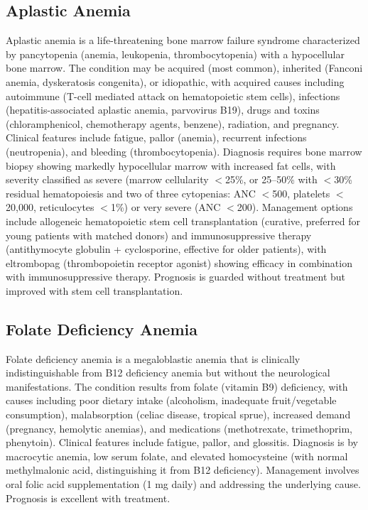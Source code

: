\subsection{Aplastic Anemia}
\label{sec:Aplastic Anemia}
Aplastic anemia is a life-threatening bone marrow failure syndrome characterized by pancytopenia (anemia, leukopenia, thrombocytopenia) with a hypocellular bone marrow. The condition may be acquired (most common), inherited (Fanconi anemia, dyskeratosis congenita), or idiopathic, with acquired causes including autoimmune (T-cell mediated attack on hematopoietic stem cells), infections (hepatitis-associated aplastic anemia, parvovirus B19), drugs and toxins (chloramphenicol, chemotherapy agents, benzene), radiation, and pregnancy. Clinical features include fatigue, pallor (anemia), recurrent infections (neutropenia), and bleeding (thrombocytopenia). Diagnosis requires bone marrow biopsy showing markedly hypocellular marrow with increased fat cells, with severity classified as severe (marrow cellularity $<$25\%, or 25--50\% with $<$30\% residual hematopoiesis and two of three cytopenias: ANC $<$500, platelets $<$20,000, reticulocytes $<$1\%) or very severe (ANC $<$200). Management options include allogeneic hematopoietic stem cell transplantation (curative, preferred for young patients with matched donors) and immunosuppressive therapy (antithymocyte globulin + cyclosporine, effective for older patients), with eltrombopag (thrombopoietin receptor agonist) showing efficacy in combination with immunosuppressive therapy. Prognosis is guarded without treatment but improved with stem cell transplantation.

\subsection{Folate Deficiency Anemia}
\label{sec:Folate Deficiency Anemia}
Folate deficiency anemia is a megaloblastic anemia that is clinically indistinguishable from B12 deficiency anemia but without the neurological manifestations. The condition results from folate (vitamin B9) deficiency, with causes including poor dietary intake (alcoholism, inadequate fruit/vegetable consumption), malabsorption (celiac disease, tropical sprue), increased demand (pregnancy, hemolytic anemias), and medications (methotrexate, trimethoprim, phenytoin). Clinical features include fatigue, pallor, and glossitis. Diagnosis is by macrocytic anemia, low serum folate, and elevated homocysteine (with normal methylmalonic acid, distinguishing it from B12 deficiency). Management involves oral folic acid supplementation (1 mg daily) and addressing the underlying cause. Prognosis is excellent with treatment.

